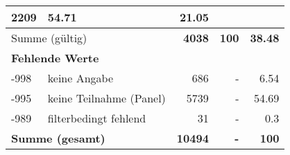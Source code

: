 \begin{longtable}{lXrrr}
       \num{2209} &
       \num[round-mode=places,round-precision=2]{54.71} &
         \num[round-mode=places,round-precision=2]{21.05} \\
     \midrule
     \multicolumn{2}{l}{Summe (gültig)} &
       \textbf{\num{4038}} &
     \textbf{\num{100}} &
       \textbf{\num[round-mode=places,round-precision=2]{38.48}} \\
     \multicolumn{5}{l}{\textbf{Fehlende Werte}}\\
       -998 &
       keine Angabe &
         \num{686} &
        - &
         \num[round-mode=places,round-precision=2]{6.54} \\
       -995 &
       keine Teilnahme (Panel) &
         \num{5739} &
        - &
         \num[round-mode=places,round-precision=2]{54.69} \\
       -989 &
       filterbedingt fehlend &
         \num{31} &
        - &
         \num[round-mode=places,round-precision=2]{0.3} \\
     \midrule
     \multicolumn{2}{l}{\textbf{Summe (gesamt)}} &
          \textbf{\num{10494}} &
        \textbf{-} &
        \textbf{\num{100}} \\
     \bottomrule
     \end{longtable}
     
